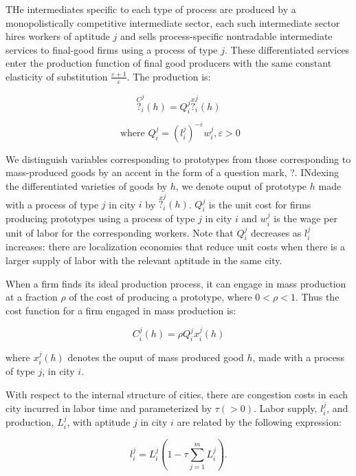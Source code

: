 THe intermediates specific to each type of process are produced by a monopolistically competitive intermediate sector, each such intermediate sector hires workers of aptitude $j$ and sells process-specific nontradable intermediate services to final-good firms using a process of type $j$. These differentiated services enter the production function of final good producers with the same constant elasticity of substitution $\frac{\varepsilon + 1}{\varepsilon}$. The production is:

\begin{equation}
  \overset{C}{?}_i^j(h) = Q_i^j \overset{x}{?}_i^j (h)
\end{equation}

\begin{equation}
  \text{ where } Q_i^j = (l_i^j)^{-\varepsilon} w_i^j, \varepsilon > 0 
\end{equation}

We distinguish variables corresponding to prototypes from those corresponding to mass-produced goods by an accent in the form of a question mark, ?. INdexing the differentiated varieties of goods by $h$, we denote ouput of prototype $h$ made with a process of type $j$ in city $i$ by $\overset{x}{?}_i^j(h)$. $Q_i^j$ is the unit cost for firms producing prototypes using a process of type $j$  in city $i$ and $w_i^j$ is the wage per unit of labor for the corresponding workers. Note that $Q_i^j$ decreases as $l_i^j$ increases: there are localization economies that reduce unit costs when there is a larger supply of labor with the relevant aptitude in the same city.

When a firm finds its ideal production process, it can engage in mass production at a fraction $\rho$ of the cost of producing a prototype, where $0 < \rho < 1$. Thus the cost function for a firm engaged in mass production is:

\begin{equation}
  C_i^j(h) = \rho Q_i^j x_i^j(h)
\end{equation}

where $x_i^j(h)$ denotes the ouput of mass produced good $h$, made with a process of type $j$, in city $i$.

With respect to the internal structure of cities, there are congestion costs in each city incurred in labor time and parameterized by $\tau (> 0)$. Labor supply, $l_i^j$, and production, $L_i^j$, with aptitude $j$ in city $i$ are related by the following expression:

\begin{equation}
  l_i^j = L_i^j(1 - \tau \sum_{j=1}^m L_i^j).
\end{equation}

